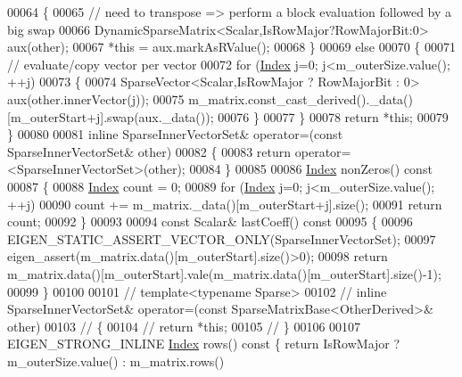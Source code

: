 \begin{DoxyCode}
00064       \{
00065         \textcolor{comment}{// need to transpose => perform a block evaluation followed by a big swap}
00066         DynamicSparseMatrix<Scalar,IsRowMajor?RowMajorBit:0> aux(other);
00067         *\textcolor{keyword}{this} = aux.markAsRValue();
00068       \}
00069       \textcolor{keywordflow}{else}
00070       \{
00071         \textcolor{comment}{// evaluate/copy vector per vector}
00072         \textcolor{keywordflow}{for} (\hyperlink{namespace_eigen_a62e77e0933482dafde8fe197d9a2cfde}{Index} j=0; j<m\_outerSize.value(); ++j)
00073         \{
00074           SparseVector<Scalar,IsRowMajor ? RowMajorBit : 0> aux(other.innerVector(j));
00075           m\_matrix.const\_cast\_derived().\_data()[m\_outerStart+j].swap(aux.\_data());
00076         \}
00077       \}
00078       \textcolor{keywordflow}{return} *\textcolor{keyword}{this};
00079     \}
00080 
00081     \textcolor{keyword}{inline} SparseInnerVectorSet& operator=(\textcolor{keyword}{const} SparseInnerVectorSet& other)
00082     \{
00083       \textcolor{keywordflow}{return} \textcolor{keyword}{operator}=<SparseInnerVectorSet>(other);
00084     \}
00085 
00086     \hyperlink{namespace_eigen_a62e77e0933482dafde8fe197d9a2cfde}{Index} nonZeros()\textcolor{keyword}{ const}
00087 \textcolor{keyword}{    }\{
00088       \hyperlink{namespace_eigen_a62e77e0933482dafde8fe197d9a2cfde}{Index} count = 0;
00089       \textcolor{keywordflow}{for} (\hyperlink{namespace_eigen_a62e77e0933482dafde8fe197d9a2cfde}{Index} j=0; j<m\_outerSize.value(); ++j)
00090         count += m\_matrix.\_data()[m\_outerStart+j].size();
00091       \textcolor{keywordflow}{return} count;
00092     \}
00093 
00094     \textcolor{keyword}{const} Scalar& lastCoeff()\textcolor{keyword}{ const}
00095 \textcolor{keyword}{    }\{
00096       EIGEN\_STATIC\_ASSERT\_VECTOR\_ONLY(SparseInnerVectorSet);
00097       eigen\_assert(m\_matrix.data()[m\_outerStart].size()>0);
00098       \textcolor{keywordflow}{return} m\_matrix.data()[m\_outerStart].vale(m\_matrix.data()[m\_outerStart].size()-1);
00099     \}
00100 
00101 \textcolor{comment}{//     template<typename Sparse>}
00102 \textcolor{comment}{//     inline SparseInnerVectorSet& operator=(const SparseMatrixBase<OtherDerived>& other)}
00103 \textcolor{comment}{//     \{}
00104 \textcolor{comment}{//       return *this;}
00105 \textcolor{comment}{//     \}}
00106 
00107     EIGEN\_STRONG\_INLINE \hyperlink{namespace_eigen_a62e77e0933482dafde8fe197d9a2cfde}{Index} rows()\textcolor{keyword}{ const }\{ \textcolor{keywordflow}{return} IsRowMajor ? m\_outerSize.value() : m\_matrix.rows()

\end{DoxyCode}
